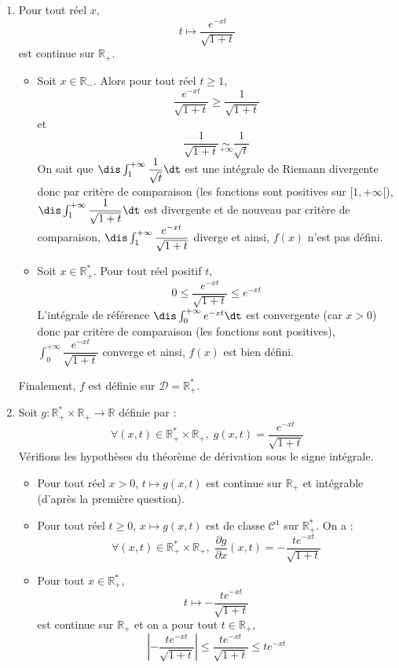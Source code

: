 \documentclass[a4paper,10pt]{report}
\begin{document}
\corr 

\begin{enumerate}
\item Pour tout réel $x$,
$$ t \mapsto \dfrac{e^{-xt}}{\sqrt{1+t}}$$
est continue sur $\mathbb{R}_+$.

\begin{itemize}
\item Soit $x \in \mathbb{R}_{-}$. Alors pour tout réel $t \geq 1$,
$$ \dfrac{e^{-xt}}{\sqrt{1+t}} \geq \dfrac{1}{\sqrt{1+t}}$$
et 
$$ \dfrac{1}{\sqrt{1+t}} \underset{+ \infty}{\sim} \dfrac{1}{\sqrt{t}}$$
On sait que $\dis \int_1^{+ \infty} \dfrac{1}{\sqrt{t}} \dt$ est une intégrale de Riemann divergente donc par critère de comparaison (les fonctions sont positives sur $[1, + \infty[$), $\dis \int_1^{+ \infty}  \dfrac{1}{\sqrt{1+t}}  \dt$ est divergente et de nouveau par critère de comparaison, $\dis \int_1^{+ \infty} \dfrac{e^{-xt}}{\sqrt{1+t}}$ diverge et ainsi, $f(x)$ n'est pas défini.
\item Soit $x \in \mathbb{R}_+^*$. Pour tout réel positif $t$,
$$ 0 \leq  \dfrac{e^{-xt}}{\sqrt{1+t}} \leq e^{-xt}$$
L'intégrale de référence $\dis \int_0^{+ \infty} e^{-xt} \dt$ est convergente (car $x>0$) donc par critère de comparaison (les fonctions sont positives), $ \int_0^{+ \infty} \dfrac{e^{-xt}}{\sqrt{1+t}}$ converge et ainsi, $f(x)$ est bien défini.
\end{itemize}
Finalement, $f$ est définie sur $\mathcal{D}= \mathbb{R}_+^*$.
\item Soit $g : \mathbb{R}_+^* \times \mathbb{R}_+ \rightarrow \mathbb{R}$ définie par :
$$ \forall (x,t) \in \mathbb{R}_+^* \times \mathbb{R}_+, \; g(x,t) = \dfrac{e^{-xt}}{\sqrt{1+t}} $$
Vérifions les hypothèses du théorème de dérivation sous le signe intégrale.
\begin{itemize}
\item Pour tout réel $x>0$, $t \mapsto g(x,t)$ est continue sur $\mathbb{R}_+$ et intégrable (d'après la première question).
\item Pour tout réel $t \geq 0$, $x \mapsto g(x,t)$ est de classe $\mathcal{C}^1$ sur $\mathbb{R}_+^*$. On a :
$$ \forall (x,t) \in \mathbb{R}_+^* \times \mathbb{R}_+, \; \dfrac{\partial g}{\partial x}(x,t) =  -  \dfrac{te^{-xt}}{\sqrt{1+t}}$$
\item Pour tout $x \in \mathbb{R}_+^*$,
$$ t \mapsto   -  \dfrac{te^{-xt}}{\sqrt{1+t}}$$
est continue sur $\mathbb{R}_+$ et on a pour tout $t \in \mathbb{R}_+$,
$$ \left\vert  -  \dfrac{te^{-xt}}{\sqrt{1+t}} \right\vert \leq  \dfrac{te^{-xt}}{\sqrt{1+t}} \leq t e^{-xt}$$

\end{itemize}
\end{enumerate}
\end{document}
